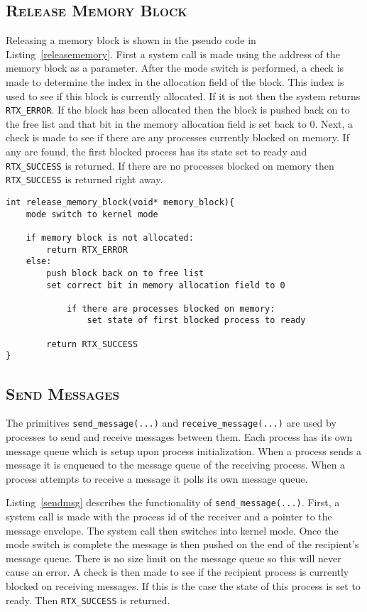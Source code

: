 \documentclass[oneside]{report}
\begin{document}
\subsection{\textsc{Release Memory Block}}
Releasing a memory block is shown in the pseudo code in
Listing~\ref{releasememory}. First a system call is made using the address of
the memory block as a parameter.  After the mode switch is performed, a check
is made to determine the index in the allocation field of the block. This index
is used to see if this block is currently allocated. If it is not then the
system returns \texttt{RTX\_ERROR}. If the block has been allocated then the
block is pushed back on to the free list and that bit in the memory allocation
field is set back to 0. Next, a check is made to see if there are any processes
currently blocked on memory. If any are found, the first blocked process has
its state set to ready and \texttt{RTX\_SUCCESS} is returned. If there are no
processes blocked on memory then \texttt{RTX\_SUCCESS} is returned right away.

\begin{lstlisting}
int release_memory_block(void* memory_block){
    mode switch to kernel mode

    if memory block is not allocated:
        return RTX_ERROR
    else:
        push block back on to free list
        set correct bit in memory allocation field to 0

            if there are processes blocked on memory:
                set state of first blocked process to ready

        return RTX_SUCCESS        
}
\end{lstlisting}

\subsection{\textsc{Send Messages}}
The primitives \texttt{send\_message(...)} and \texttt{receive\_message(...)}
are used by processes to send and receive messages between them. Each process
has its own message queue which is setup upon process initialization.
When a process sends a message it is enqueued to the message queue of the
receiving process. When a process attempts to receive a message it polls its
own message queue.

Listing~\ref{sendmsg} describes the functionality of
\texttt{send\_message(...)}.  First, a system call is made with the
process id of the receiver and a pointer to the message envelope. The
system call then switches into kernel mode. Once the mode switch is
complete the message is then pushed on the end of the recipient's
message queue. There is no size limit on the message queue so this
will never cause an error. A check is then made to see if the
recipient process is currently blocked on receiving messages. If this
is the case the state of this process is set to ready. Then
\texttt{RTX\_SUCCESS} is returned.
\end{document}
